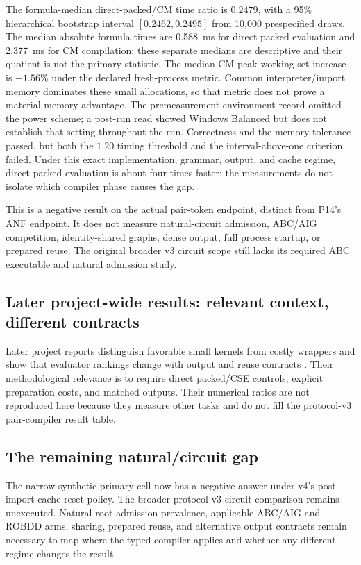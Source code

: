 \documentclass[10pt]{article}
\theoremstyle{plain}
\theoremstyle{definition}
\theoremstyle{remark}
\begin{document}
The formula-median direct-packed/CM time ratio is $0.2479$, with a 95\% hierarchical bootstrap interval $[0.2462,0.2495]$ from 10,000 prespecified draws. The median absolute formula times are 0.588~ms for direct packed evaluation and 2.377~ms for CM compilation; these separate medians are descriptive and their quotient is not the primary statistic. The median CM peak-working-set increase is $-1.56\%$ under the declared fresh-process metric. Common interpreter/import memory dominates these small allocations, so that metric does not prove a material memory advantage. The premeasurement environment record omitted the power scheme; a post-run read showed Windows Balanced but does not establish that setting throughout the run. Correctness and the memory tolerance passed, but both the $1.20$ timing threshold and the interval-above-one criterion failed. Under this exact implementation, grammar, output, and cache regime, direct packed evaluation is about four times faster; the measurements do not isolate which compiler phase causes the gap.

This is a negative result on the actual pair-token endpoint, distinct from P14's ANF endpoint. It does not measure natural-circuit admission, ABC/AIG competition, identity-shared graphs, dense output, full process startup, or prepared reuse. The original broader v3 circuit scope still lacks its required ABC executable and natural admission study.

\subsection{Later project-wide results: relevant context, different contracts}
\label{sec:later-context}

Later project reports distinguish favorable small kernels from costly wrappers and show that evaluator rankings change with output and reuse contracts \cite{ProjectCorrection20260825,ProjectArchitecture20260903}. Their methodological relevance is to require direct packed/CSE controls, explicit preparation costs, and matched outputs. Their numerical ratios are not reproduced here because they measure other tasks and do not fill the protocol-v3 pair-compiler result table.

\subsection{The remaining natural/circuit gap}

The narrow synthetic primary cell now has a negative answer under v4's post-import cache-reset policy. The broader protocol-v3 circuit comparison remains unexecuted. Natural root-admission prevalence, applicable ABC/AIG and ROBDD arms, sharing, prepared reuse, and alternative output contracts remain necessary to map where the typed compiler applies and whether any different regime changes the result.
\end{document}
